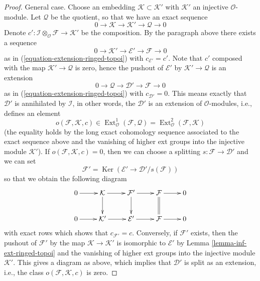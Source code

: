 \documentclass{stacks-project}
\theoremstyle{plain}
\theoremstyle{definition}
\theoremstyle{remark}
\numberwithin{equation}{subsection}
\def\Ext{\mathop{\mathrm{Ext}}\nolimits}
\def\Ker{\mathop{\mathrm{Ker}}}
\begin{document}
\begin{proof}
\medskip\noindent
General case. Choose an embedding $\mathcal{K} \subset \mathcal{K}'$
with $\mathcal{K}'$ an injective $\mathcal{O}$-module. Let $\mathcal{Q}$
be the quotient, so that we have an exact sequence
$$
0 \to \mathcal{K} \to \mathcal{K}' \to \mathcal{Q} \to 0
$$
Denote
$c' : \mathcal{I} \otimes_\mathcal{O} \mathcal{F} \to \mathcal{K}'$
be the composition. By the paragraph above there exists a sequence
$$
0 \to \mathcal{K}' \to \mathcal{E}' \to \mathcal{F} \to 0
$$
as in (\ref{equation-extension-ringed-topoi}) with $c_{\mathcal{E}'} = c'$.
Note that $c'$ composed with the map $\mathcal{K}' \to \mathcal{Q}$
is zero, hence the pushout of $\mathcal{E}'$ by
$\mathcal{K}' \to \mathcal{Q}$ is an extension
$$
0 \to \mathcal{Q} \to \mathcal{D}' \to \mathcal{F} \to 0
$$
as in (\ref{equation-extension-ringed-topoi}) with $c_{\mathcal{D}'} = 0$.
This means exactly that $\mathcal{D}'$ is annihilated by
$\mathcal{I}$, in other words, the $\mathcal{D}'$ is an extension
of $\mathcal{O}$-modules, i.e., defines an element
$$
o(\mathcal{F}, \mathcal{K}, c) \in
\Ext^1_\mathcal{O}(\mathcal{F}, \mathcal{Q}) =
\Ext^2_\mathcal{O}(\mathcal{F}, \mathcal{K})
$$
(the equality holds by the long exact cohomology sequence associated
to the exact sequence above and the vanishing of higher ext groups
into the injective module $\mathcal{K}'$). If
$o(\mathcal{F}, \mathcal{K}, c) = 0$, then we can choose a splitting
$s : \mathcal{F} \to \mathcal{D}'$ and we can set
$$
\mathcal{F}' = \Ker(\mathcal{E}' \to \mathcal{D}'/s(\mathcal{F}))
$$
so that we obtain the following diagram
$$
\xymatrix{
0 \ar[r] &
\mathcal{K} \ar[r] \ar[d] &
\mathcal{F}' \ar[r] \ar[d] &
\mathcal{F} \ar[r] \ar@{=}[d] &
0 \\
0 \ar[r] &
\mathcal{K}' \ar[r] &
\mathcal{E}' \ar[r] &
\mathcal{F} \ar[r] & 0
}
$$
with exact rows which shows that $c_{\mathcal{F}'} = c$. Conversely, if
$\mathcal{F}'$ exists, then the pushout of $\mathcal{F}'$ by the map
$\mathcal{K} \to \mathcal{K}'$ is isomorphic to $\mathcal{E}'$ by
Lemma \ref{lemma-inf-ext-ringed-topoi} and the vanishing of higher ext groups
into the injective module $\mathcal{K}'$. This gives a diagram
as above, which implies that $\mathcal{D}'$ is split as an extension, i.e.,
the class $o(\mathcal{F}, \mathcal{K}, c)$ is zero.
\end{proof}
\end{document}
